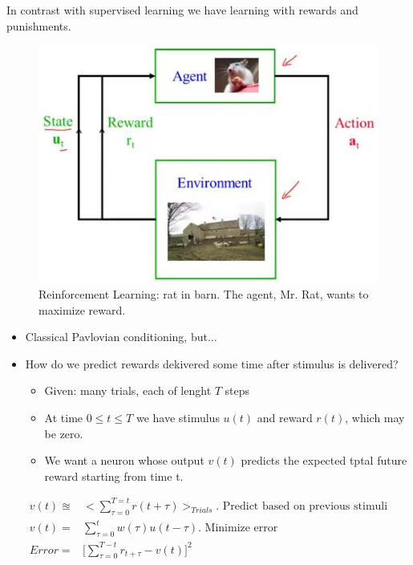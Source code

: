 \documentclass[]{article}
\begin{document}
In contrast with supervised learning we have learning with rewards and punishments.
\begin{figure}[H]
	\begin{center}
		\caption[Reinforcement Learning: rat in barn]{Reinforcement Learning: rat in barn. The agent, Mr. Rat, wants to maximize reward.}
		\includegraphics[width=\textwidth]{rat-barn}
	\end{center}
\end{figure}

\begin{itemize}
	\item Classical Pavlovian conditioning, but...
	\item How do we predict rewards dekivered some time after stimulus is delivered?
	\begin{itemize}
		\item Given: many trials, each of lenght $T$ steps
		\item At time $0\le t\le T$ we have stimulus $u(t)$ and reward $r(t)$, which may be zero.
		\item We want a neuron whose output $v(t)$ predicts the expected tptal future reward starting from time t.  
	\end{itemize}
\end{itemize}

\begin{align*}
	v(t) \approxeq& \Big<\sum_{\tau=0}^{T=t}r(t+\tau)\Big>_{Trials}\text{. Predict based on previous stimuli}\\
	v(t) =& \sum_{\tau=0}^{t}w(\tau)u(t-\tau)\text{. Minimize error}\\
	Error=&\big[\sum_{\tau=0}^{T-t}r_{t+\tau}-v(t)\big]^2
\end{align*}
\end{document}
